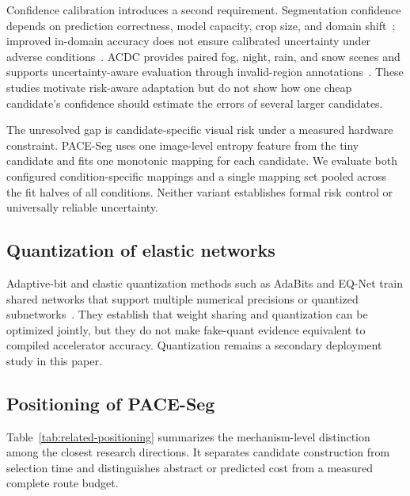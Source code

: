 \documentclass[a4paper,review,12pt]{elsarticle}
\newcommand{\method}{PACE-Seg}
\begin{document}
Confidence calibration introduces a second requirement. Segmentation confidence depends on prediction correctness, model capacity, crop size, and domain shift~\cite{wang2023calibrating}; improved in-domain accuracy does not ensure calibrated uncertainty under adverse conditions~\cite{dejorge2023reliability}. ACDC provides paired fog, night, rain, and snow scenes and supports uncertainty-aware evaluation through invalid-region annotations~\cite{sakaridis2021acdc}. These studies motivate risk-aware adaptation but do not show how one cheap candidate's confidence should estimate the errors of several larger candidates.

The unresolved gap is candidate-specific visual risk under a measured hardware constraint. \method{} uses one image-level entropy feature from the tiny candidate and fits one monotonic mapping for each candidate. We evaluate both configured condition-specific mappings and a single mapping set pooled across the fit halves of all conditions. Neither variant establishes formal risk control or universally reliable uncertainty.

\subsection{Quantization of elastic networks}

Adaptive-bit and elastic quantization methods such as AdaBits and EQ-Net train shared networks that support multiple numerical precisions or quantized subnetworks~\cite{jin2020adabits,xu2023eqnet}. They establish that weight sharing and quantization can be optimized jointly, but they do not make fake-quant evidence equivalent to compiled accelerator accuracy. Quantization remains a secondary deployment study in this paper.

\subsection{Positioning of PACE-Seg}

Table~\ref{tab:related-positioning} summarizes the mechanism-level distinction among the closest research directions. It separates candidate construction from selection time and distinguishes abstract or predicted cost from a measured complete route budget.
\end{document}
